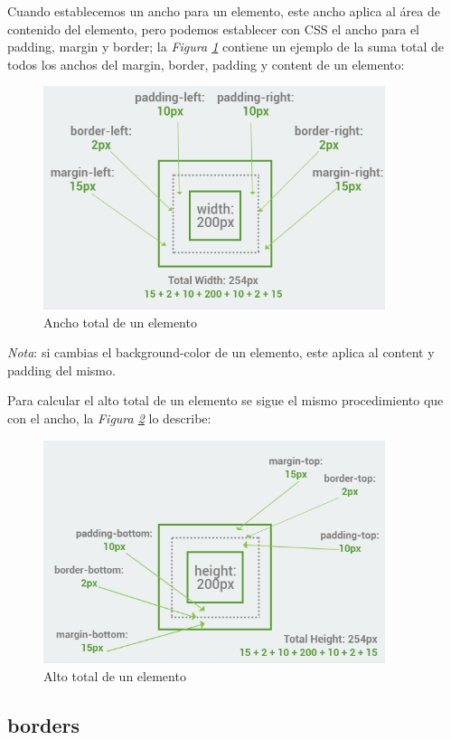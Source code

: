 Cuando establecemos un ancho para un elemento, este ancho aplica al área de contenido del elemento, pero podemos establecer con CSS el ancho para el padding, margin y border; la \textit{Figura \ref{fig: 20}} contiene un ejemplo de la suma total de todos los anchos del margin, border, padding y content de un elemento:
\begin{figure}[H]
    \centering
    \caption{Ancho total de un elemento}
    \label{fig: 20}
    \includegraphics[width=10cm]{ss/box-anchoTotal.png}
\end{figure}

\textit{Nota}: si cambias el background-color de un elemento, este aplica al content y padding del mismo.

Para calcular el alto total de un elemento se sigue el mismo procedimiento que con el ancho, la \textit{Figura \ref{fig: 21}} lo describe:
\begin{figure}[H]
    \centering
    \caption{Alto total de un elemento}
    \label{fig: 21}
    \includegraphics[width=10cm]{ss/box-altoTotal.png}
\end{figure}


\subsection{borders}


